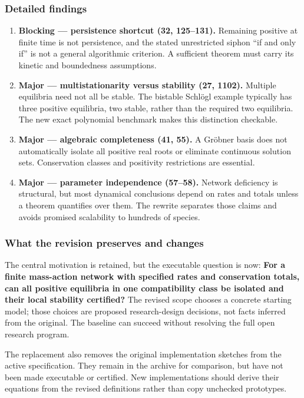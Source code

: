 \documentclass[
  11pt,
]{article}
\begin{document}
\subsubsection{Detailed findings}

\begin{enumerate}
\def\labelenumi{\arabic{enumi}.}
\item
  \textbf{Blocking --- persistence shortcut (32, 125--131).} Remaining
  positive at finite time is not persistence, and the stated
  unrestricted siphon ``if and only if'' is not a general algorithmic
  criterion. A sufficient theorem must carry its kinetic and boundedness
  assumptions.
\item
  \textbf{Major --- multistationarity versus stability (27, 1102).}
  Multiple equilibria need not all be stable. The bistable Schlögl
  example typically has three positive equilibria, two stable, rather
  than the required two equilibria. The new exact polynomial benchmark
  makes this distinction checkable.
\item
  \textbf{Major --- algebraic completeness (41, 55).} A Gröbner basis
  does not automatically isolate all positive real roots or eliminate
  continuous solution sets. Conservation classes and positivity
  restrictions are essential.
\item
  \textbf{Major --- parameter independence (57--58).} Network deficiency
  is structural, but most dynamical conclusions depend on rates and
  totals unless a theorem quantifies over them. The rewrite separates
  those claims and avoids promised scalability to hundreds of species.
\end{enumerate}

\subsubsection{What the revision preserves and changes}

The central motivation is retained, but the executable question is now:
\textbf{For a finite mass-action network with specified rates and
conservation totals, can all positive equilibria in one compatibility
class be isolated and their local stability certified?} The revised
scope chooses a concrete starting model; those choices are proposed
research-design decisions, not facts inferred from the original. The
baseline can succeed without resolving the full open research program.

The replacement also removes the original implementation sketches from
the active specification. They remain in the archive for comparison, but
have not been made executable or certified. New implementations should
derive their equations from the revised definitions rather than copy
unchecked prototypes.
\end{document}
